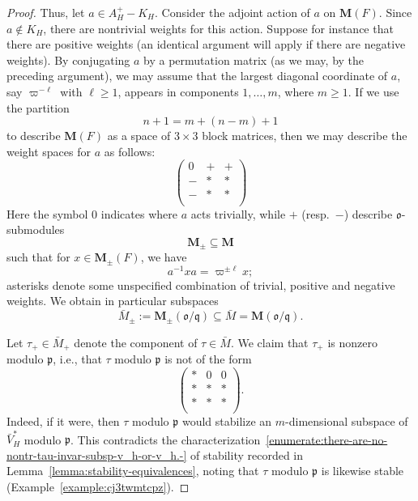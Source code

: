 \documentclass[reqno]{amsart}
\theoremstyle{plain} \newtheorem{theorem} {Theorem} \newtheorem{conjecture} {Conjecture} \newtheorem{corollary} [theorem] {Corollary} \newtheorem{proposition} [theorem] {Proposition} \newtheorem{fact} [theorem] {Fact}
\theoremstyle{definition} \newtheorem{definition} [theorem] {Definition}
\theoremstyle{itplain} %
\newcommand{\mfq}{\mathfrak{q}}
\begin{document}
\begin{proof}
  Thus, let $a \in A_H^+ - K_H$.  Consider the adjoint action of $a$ on $\mathbf{M}(F)$.  Since $a \notin K_H$, there are nontrivial weights for this action.  Suppose for instance that there are positive weights (an identical argument will apply if there are negative weights).  By conjugating $a$ by a permutation matrix (as we may, by the preceding argument), we may assume that the largest diagonal coordinate of $a$, say $\varpi^{-\ell}$ with $\ell \geq 1$, appears in components $1, \dotsc, m$, where $m \geq 1$.  If we use the partition
  \begin{equation*}
    n+1 = m + (n -m) + 1
  \end{equation*}
  to describe $\mathbf{M}(F)$ as a space of $3 \times 3$ block matrices, then we may describe the weight spaces for $a$ as follows:
  \begin{equation*}
    \begin{pmatrix}
      0 & + & + \\
      - & \ast & \ast \\
      - & \ast & \ast \\
    \end{pmatrix}
  \end{equation*}
  Here the symbol $0$ indicates where $a$ acts trivially, while $+$ (resp.\ $-$) describe $\mathfrak{o}$-submodules
  \begin{equation*}
    \mathbf{M}_{\pm} \subseteq \mathbf{M}
  \end{equation*}
  such that for $x \in \mathbf{M}_{\pm}(F)$, we have
  \begin{equation*}
    a^{-1} x a = \varpi^{\pm \ell } x;
  \end{equation*}
  asterisks denote some unspecified combination of trivial, positive and negative weights.  We obtain in particular subspaces
  \begin{equation*}
    \bar{M}_{\pm } := \mathbf{M}_{\pm}(\mathfrak{o}/\mfq) \subseteq \bar{M} = \mathbf{M}(\mathfrak{o}/\mfq).
  \end{equation*}

  Let $\tau_+ \in \bar{M}_+$ denote the component of $\tau \in \bar{M}$.  We claim that $\tau_+$ is nonzero modulo $\mathfrak{p}$, i.e., that $\tau$ modulo $\mathfrak{p}$ is not of the form
  \begin{equation*}
    \begin{pmatrix}
      \ast & 0 & 0 \\
      \ast & \ast & \ast \\
      \ast & \ast & \ast \\
    \end{pmatrix}.
  \end{equation*}
  Indeed, if it were, then $\tau$ modulo $\mathfrak{p}$ would stabilize an $m$-dimensional subspace of $\bar{V}_H^*$ modulo $\mathfrak{p}$.  This contradicts the characterization~\eqref{enumerate:there-are-no-nontr-tau-invar-subsp-v_h-or-v_h.-} of stability recorded in Lemma~\ref{lemma:stability-equivalences}, noting that $\tau$ modulo $\mathfrak{p}$ is likewise stable (Example~\ref{example:cj3twmtcpz}).


\end{proof}
\end{document}
